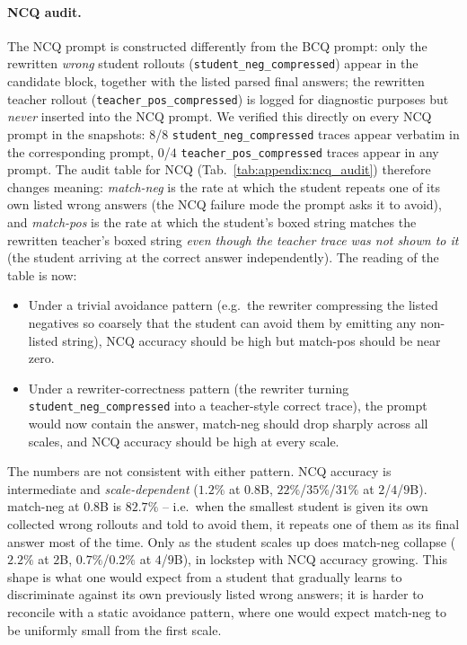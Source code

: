 \paragraph{NCQ audit.}
The NCQ prompt is constructed differently from the BCQ prompt: only the rewritten \emph{wrong} student rollouts (\texttt{student\_neg\_compressed}) appear in the candidate block, together with the listed parsed final answers; the rewritten teacher rollout (\texttt{teacher\_pos\_compressed}) is logged for diagnostic purposes but \emph{never} inserted into the NCQ prompt. We verified this directly on every NCQ prompt in the snapshots: $8$/$8$ \texttt{student\_neg\_compressed} traces appear verbatim in the corresponding prompt, $0$/$4$ \texttt{teacher\_pos\_compressed} traces appear in any prompt. The audit table for NCQ (Tab.~\ref{tab:appendix:ncq_audit}) therefore changes meaning: \emph{match-neg} is the rate at which the student repeats one of its own listed wrong answers (the NCQ failure mode the prompt asks it to avoid), and \emph{match-pos} is the rate at which the student's boxed string matches the rewritten teacher's boxed string \emph{even though the teacher trace was not shown to it} (the student arriving at the correct answer independently). The reading of the table is now:
\begin{itemize}[leftmargin=12pt,topsep=2pt,itemsep=2pt]
  \item Under a trivial avoidance pattern (e.g.\ the rewriter compressing the listed negatives so coarsely that the student can avoid them by emitting any non-listed string), NCQ accuracy should be high but match-pos should be near zero.
  \item Under a rewriter-correctness pattern (the rewriter turning \texttt{student\_neg\_compressed} into a teacher-style correct trace), the prompt would now contain the answer, match-neg should drop sharply across all scales, and NCQ accuracy should be high at every scale.
\end{itemize}
The numbers are not consistent with either pattern. NCQ accuracy is intermediate and \emph{scale-dependent} ($1.2\%$ at $0.8$B, $22\%$/$35\%$/$31\%$ at $2$/$4$/$9$B). match-neg at $0.8$B is $82.7\%$ -- i.e.\ when the smallest student is given its own collected wrong rollouts and told to avoid them, it repeats one of them as its final answer most of the time. Only as the student scales up does match-neg collapse ($2.2\%$ at $2$B, $0.7\%$/$0.2\%$ at $4$/$9$B), in lockstep with NCQ accuracy growing. This shape is what one would expect from a student that gradually learns to discriminate against its own previously listed wrong answers; it is harder to reconcile with a static avoidance pattern, where one would expect match-neg to be uniformly small from the first scale.

